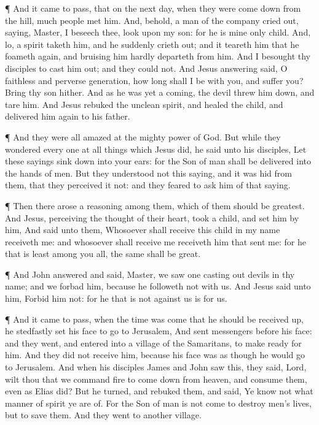  ¶ And it came to pass, that on the next day, when they
were come down from the hill, much people met him.  And,
behold, a man of the company cried out, saying, Master, I beseech thee,
look upon my son: for he is mine only child.  And, lo, a
spirit taketh him, and he suddenly crieth out; and it teareth him that
he foameth again, and bruising him hardly departeth from him.
 And I besought thy disciples to cast him out; and they
could not.  And Jesus answering said, O faithless and
perverse generation, how long shall I be with you, and suffer you? Bring
thy son hither.  And as he was yet a coming, the devil
threw him down, and tare him. And Jesus rebuked the unclean spirit, and
healed the child, and delivered him again to his father.

 ¶ And they were all amazed at the mighty power of God. But
while they wondered every one at all things which Jesus did, he said
unto his disciples,  Let these sayings sink down into your
ears: for the Son of man shall be delivered into the hands of men.
 But they understood not this saying, and it was hid from
them, that they perceived it not: and they feared to ask him of that
saying.

 ¶ Then there arose a reasoning among them, which of them
should be greatest.  And Jesus, perceiving the thought of
their heart, took a child, and set him by him,  And said
unto them, Whosoever shall receive this child in my name receiveth me:
and whosoever shall receive me receiveth him that sent me: for he that
is least among you all, the same shall be great.

 ¶ And John answered and said, Master, we saw one casting
out devils in thy name; and we forbad him, because he followeth not with
us.  And Jesus said unto him, Forbid him not: for he that
is not against us is for us.

 ¶ And it came to pass, when the time was come that he
should be received up, he stedfastly set his face to go to Jerusalem,
 And sent messengers before his face: and they went, and
entered into a village of the Samaritans, to make ready for him.
 And they did not receive him, because his face was as
though he would go to Jerusalem.  And when his disciples
James and John saw this, they said, Lord, wilt thou that we command fire
to come down from heaven, and consume them, even as Elias did?
 But he turned, and rebuked them, and said, Ye know not
what manner of spirit ye are of.  For the Son of man is not
come to destroy men's lives, but to save them. And they went to another
village.

